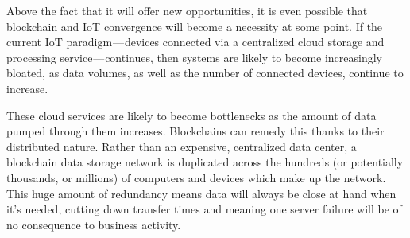 Above the fact that it will offer new opportunities, it is even possible that blockchain and IoT convergence will become a necessity at some point. If the current IoT paradigm — devices connected via a centralized cloud storage and processing service — continues, then systems are likely to become increasingly bloated, as data volumes, as well as the number of connected devices, continue to increase.

These cloud services are likely to become bottlenecks as the amount of data pumped through them increases. Blockchains can remedy this thanks to their distributed nature. Rather than an expensive, centralized data center, a blockchain data storage network is duplicated across the hundreds (or potentially thousands, or millions) of computers and devices which make up the network. This huge amount of redundancy means data will always be close at hand when it’s needed, cutting down transfer times and meaning one server failure will be of no consequence to business activity.

